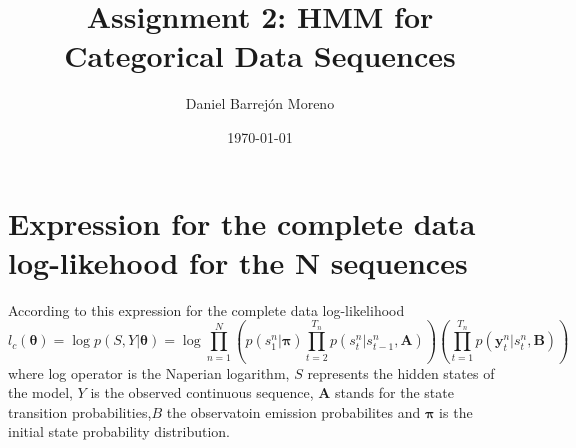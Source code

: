 \documentclass[12pt]{article}
\begin{document}
	


\title{Assignment 2: HMM for Categorical Data Sequences}%
\author{Daniel Barrejón Moreno} %
\date{\today}
\maketitle

	
\section{Expression for the complete data log-likehood for the N sequences}
According to this expression for the complete data log-likelihood
\begin{equation}
\label{ll1}
l_{c}\left(\boldsymbol\theta\right) = \log p ( S , Y | \boldsymbol\theta ) = \log \prod _ { n = 1 } ^ { N } \left( p \left( s _ { 1 } ^ { n } | \boldsymbol\pi \right) \prod _ { t = 2 } ^ { T _ { n } } p \left( s _ { t } ^ { n } | s _ { t - 1 } ^ { n } , \mathbf { A } \right) \right) \left( \prod _ { t = 1 } ^ { T _ { n } } p \left( \mathbf { y } _ { t } ^ { n } | s _ { t } ^ { n } , \mathbf { B } \right) \right)
\end{equation}
where log operator is the Naperian logarithm, $S$ represents the hidden states of the model, $Y$ is the observed continuous sequence, $\mathbf { A }$ stands for the state transition probabilities,$B$ the observatoin emission probabilites and $\boldsymbol\pi$ is the initial state probability distribution. \\
\end{document}
